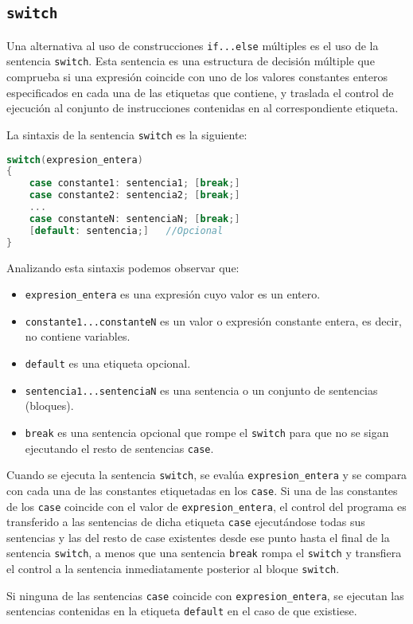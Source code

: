 \subsection{\texttt{switch}}{
Una alternativa al uso de construcciones \texttt{if...else} múltiples es el uso de la sentencia \texttt{switch}. Esta sentencia es una estructura de decisión múltiple que comprueba si una expresión coincide con uno de los valores constantes enteros especificados en cada una de las etiquetas que contiene, y traslada el control de ejecución al conjunto de instrucciones contenidas en al correspondiente etiqueta.

La sintaxis de la sentencia \texttt{switch} es la siguiente:
\begin{lstlisting}[language=C]
switch(expresion_entera)
{
    case constante1: sentencia1; [break;]
    case constante2: sentencia2; [break;]
    ...
    case constanteN: sentenciaN; [break;]
    [default: sentencia;]	//Opcional
}
\end{lstlisting}
Analizando esta sintaxis podemos observar que:
\begin{itemize}
	\item \texttt{expresion\_entera} es una expresión cuyo valor es un entero.
	\item \texttt{constante1...constanteN} es un valor o expresión constante entera, es decir, no contiene variables.
	\item \texttt{default} es una etiqueta opcional.
	\item \texttt{sentencia1...sentenciaN} es una sentencia o un conjunto de sentencias (bloques).
	\item \texttt{break} es una sentencia opcional que rompe el \texttt{switch} para que no se sigan ejecutando el resto de sentencias \texttt{case}.
\end{itemize}
Cuando se ejecuta la sentencia \texttt{switch}, se evalúa \texttt{expresion\_entera} y se compara con cada una de las constantes etiquetadas en los \texttt{case}. Si una de las constantes de los \texttt{case} coincide con el valor de \texttt{expresion\_entera}, el control del programa es transferido a las sentencias de dicha etiqueta \texttt{case} ejecutándose todas sus sentencias y las del resto de case existentes desde ese punto hasta el final de la sentencia \texttt{switch}, a menos que una sentencia \texttt{break} rompa el \texttt{switch} y transfiera el control a la sentencia inmediatamente posterior al bloque \texttt{switch}.

Si ninguna de las sentencias \texttt{case} coincide con \texttt{expresion\_entera}, se ejecutan las sentencias contenidas en la etiqueta \texttt{default} en el caso de que existiese.

}
